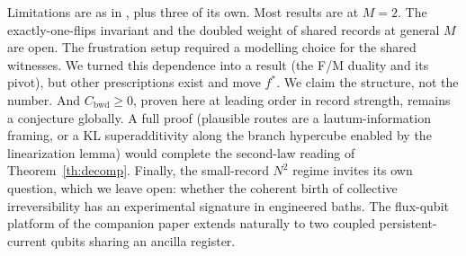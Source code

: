 \documentclass[11pt]{article}
\newcommand{\Cbwd}{C_{\mathrm{bwd}}}
\begin{document}
Limitations are as in \cite{Lejri2026}, plus three of its own. Most results are at $M=2$. The exactly-one-flips invariant and the doubled weight of shared records at general $M$ are open. The frustration setup required a modelling choice for the shared witnesses. We turned this dependence into a result (the F/M duality and its pivot), but other prescriptions exist and move $f^*$. We claim the structure, not the number. And $\Cbwd\ge0$, proven here at leading order in record strength, remains a conjecture globally. A full proof (plausible routes are a lautum-information framing, or a KL superadditivity along the branch hypercube enabled by the linearization lemma) would complete the second-law reading of Theorem~\ref{th:decomp}. Finally, the small-record $N^2$ regime invites its own question, which we leave open: whether the coherent birth of collective irreversibility has an experimental signature in engineered baths. The flux-qubit platform of the companion paper \cite{Friedman2000} extends naturally to two coupled persistent-current qubits sharing an ancilla register.

\appendix
\end{document}
